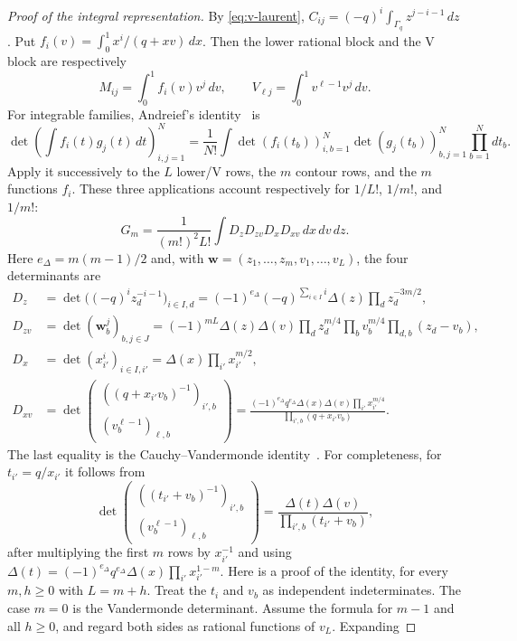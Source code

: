 \begin{proof}[Proof of the integral representation]
By \eqref{eq:v-laurent},
\(C_{ij}=(-q)^i\int_{\Gamma_q}z^{j-i-1}\,dz\).  Put
\(f_i(v)=\int_0^1x^i/(q+xv)\,dx\).  Then the lower rational block and the
V block are respectively
\[
 M_{ij}=\int_0^1f_i(v)v^j\,dv,\qquad
 V_{\ell j}=\int_0^1v^{\ell-1}v^j\,dv.
\]
For integrable families, Andreief's identity~\cite{Andreief,Forrester} is
\[
 \det\left(\int f_i(t)g_j(t)\,dt\right)_{i,j=1}^N
 =\frac1{N!}\int
   \det(f_i(t_b))_{i,b=1}^N\det(g_j(t_b))_{b,j=1}^N
   \prod_{b=1}^Ndt_b.
\]
Apply it successively to the $L$ lower/V rows, the $m$ contour rows, and
the $m$ functions $f_i$.  These three applications account respectively
for $1/L!$, $1/m!$, and $1/m!$:
\[
 G_m=\frac1{(m!)^2L!}\int D_zD_{zv}D_xD_{xv}\,dx\,dv\,dz.
\]
Here $e_\Delta=m(m-1)/2$ and, with
\(\mathbf w=(z_1,\ldots,z_m,v_1,\ldots,v_L)\), the four determinants are
\begin{align*}
 D_z&=\det\bigl((-q)^iz_d^{-i-1}\bigr)_{i\in I,d}
   =(-1)^{e_\Delta}(-q)^{\sum_{i\in I}i}
     \Delta(z)\prod_dz_d^{-3m/2},\\
 D_{zv}&=\det(\mathbf w_b^j)_{b,j\in J}
   =(-1)^{mL}\Delta(z)\Delta(v)
     \prod_dz_d^{m/4}\prod_bv_b^{m/4}\prod_{d,b}(z_d-v_b),\\
 D_x&=\det(x_{i'}^i)_{i\in I,i'}
   =\Delta(x)\prod_{i'}x_{i'}^{m/2},\\
 D_{xv}&=\det\begin{pmatrix}
 ((q+x_{i'}v_b)^{-1})_{i',b}\\(v_b^{\ell-1})_{\ell,b}
 \end{pmatrix}
   =\frac{(-1)^{e_\Delta}q^{e_\Delta}\Delta(x)\Delta(v)\prod_{i'}x_{i'}^{m/4}}
          {\prod_{i',b}(q+x_{i'}v_b)}.
\end{align*}
The last equality is the Cauchy--Vandermonde identity~\cite{Krattenthaler}.
For completeness,
for $t_{i'}=q/x_{i'}$ it follows from
\[
 \det\begin{pmatrix}((t_{i'}+v_b)^{-1})_{i',b}\\
 (v_b^{\ell-1})_{\ell,b}\end{pmatrix}
 =\frac{\Delta(t)\Delta(v)}{\prod_{i',b}(t_{i'}+v_b)},
\]
after multiplying the first $m$ rows by $x_{i'}^{-1}$ and using
\(\Delta(t)=(-1)^{e_\Delta}q^{e_\Delta}\Delta(x)\prod_{i'}x_{i'}^{1-m}\).
Here is a proof of the identity, for every $m,h\ge0$ with $L=m+h$.
Treat the $t_i$ and $v_b$ as independent indeterminates.  The case $m=0$
is the Vandermonde determinant.  Assume the formula for $m-1$ and all
$h\ge0$, and regard both sides as rational functions of $v_L$.  Expanding

\end{proof}
